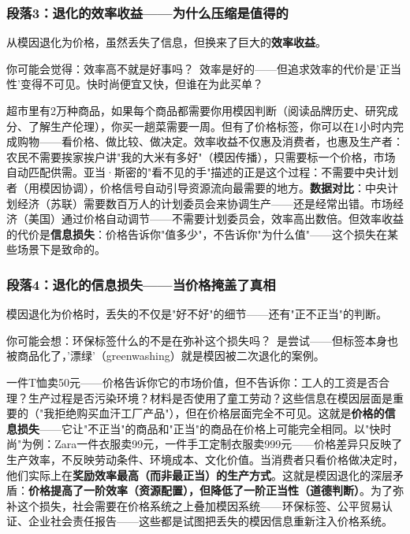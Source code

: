 \documentclass[../main.tex]{subfiles}
\begin{document}
	\subsubsection*{段落3：退化的效率收益——为什么压缩是值得的}

	从模因退化为价格，虽然丢失了信息，但换来了巨大的\textbf{效率收益}。

	\begin{tcolorbox}[colback=yellow!5, title=\textit{读者行为预测}]

		你可能会觉得：效率高不就是好事吗？\ 效率是好的——但追求效率的代价是'正当性'变得不可见。快时尚便宜又快，但谁在为此买单？

	\end{tcolorbox}

超市里有2万种商品，如果每个商品都需要你用模因判断（阅读品牌历史、研究成分、了解生产伦理），你买一趟菜需要一周。但有了价格标签，你可以在1小时内完成购物——看价格、做比较、做决定。效率收益不仅惠及消费者，也惠及生产者：农民不需要挨家挨户讲"我的大米有多好"（模因传播），只需要标一个价格，市场自动匹配供需。亚当·斯密的"看不见的手"描述的正是这个过程：不需要中央计划者（用模因协调），价格信号自动引导资源流向最需要的地方。\textbf{数据对比}：中央计划经济（苏联）需要数百万人的计划委员会来协调生产——还是经常出错。市场经济（美国）通过价格自动调节——不需要计划委员会，效率高出数倍。但效率收益的代价是\textbf{信息损失}：价格告诉你"值多少"，不告诉你"为什么值"——这个损失在某些场景下是致命的。

	\subsubsection*{段落4：退化的信息损失——当价格掩盖了真相}

	模因退化为价格时，丢失的不仅是"好不好"的细节——还有"正不正当"的判断。

	\begin{tcolorbox}[colback=yellow!5, title=\textit{读者行为预测}]

		你可能会想：环保标签什么的不是在弥补这个损失吗？\ 是尝试——但标签本身也被商品化了，'漂绿'（greenwashing）就是模因被二次退化的案例。

	\end{tcolorbox}

一件T恤卖50元——价格告诉你它的市场价值，但不告诉你：工人的工资是否合理？生产过程是否污染环境？材料是否使用了童工劳动？这些信息在模因层面是重要的（"我拒绝购买血汗工厂产品"），但在价格层面完全不可见。这就是\textbf{价格的信息损失}——它让"不正当"的商品和"正当"的商品在价格上可能完全相同。以"快时尚"为例：Zara一件衣服卖99元，一件手工定制衣服卖999元——价格差异只反映了生产效率，不反映劳动条件、环境成本、文化价值。当消费者只看价格做决定时，他们实际上在\textbf{奖励效率最高（而非最正当）的生产方式}。这就是模因退化的深层矛盾：\textbf{价格提高了一阶效率（资源配置），但降低了一阶正当性（道德判断）}。为了弥补这个损失，社会需要在价格系统之上叠加模因系统——环保标签、公平贸易认证、企业社会责任报告——这些都是试图把丢失的模因信息重新注入价格系统。
\end{document}

